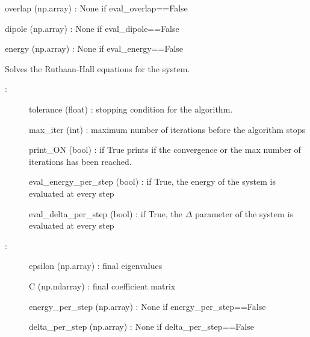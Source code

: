 \documentclass[letterpaper,10pt,english]{sphinxmanual}
\begin{document}
\begin{fulllineitems}
\begin{fulllineitems}
\begin{description}
overlap (np.array) : None if eval\_overlap==False

dipole (np.array) : None if eval\_dipole==False

energy (np.array) : None if eval\_energy==False

\end{description}

\end{fulllineitems}


\begin{fulllineitems}
\label{\detokenize{index:do.GHF.solve_TIHF}}
Solves the Ruthaan-Hall equations for the system.
\begin{description}
\item[{:}] \leavevmode
tolerance (float) : stopping condition for the algorithm.

max\_iter (int) : maximum number of iterations before the algorithm stops

print\_ON (bool) : if True prints if the convergence or the max number of iterations has been reached.

eval\_energy\_per\_step (bool) : if True, the energy of the system is evaluated at every step

eval\_delta\_per\_step (bool) : if True, the \(\Delta\) parameter of the system is evaluated at every step

\item[{:}] \leavevmode
epsilon (np.array) : final eigenvalues

C (np.ndarray) : final coefficient matrix

energy\_per\_step (np.array) : None if energy\_per\_step==False

delta\_per\_step (np.array) : None if delta\_per\_step==False

\end{description}

\end{fulllineitems}


\end{fulllineitems}

\end{document}
